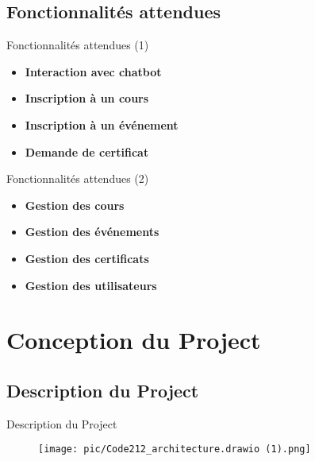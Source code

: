 \documentclass{beamer}
\begin{document}
\subsection{Fonctionnalités attendues}


\begin{frame}{Fonctionnalités attendues (1)}

    \begin{itemize}
        \setlength\itemsep{0.8em} %
        \item \textbf{Interaction avec chatbot}
        \item \textbf{Inscription à un cours}
        \item \textbf{Inscription à un événement}
        \item \textbf{Demande de certificat}

    \end{itemize}

\end{frame}


\begin{frame}{Fonctionnalités attendues (2)}

    \begin{itemize}
        \setlength\itemsep{0.8em} %

        \item \textbf{Gestion des cours}
        \item \textbf{Gestion des événements}
        \item \textbf{Gestion des certificats}
        \item \textbf{Gestion des utilisateurs}
    \end{itemize}

\end{frame}





\section{Conception du Project}
\subsection{Description du Project}
\begin{frame}{Description du Project}
    \begin{figure}[htpb]
        \centering
        \texttt{[image: pic/Code212\_architecture.drawio (1).png]}
    \end{figure}

\end{frame}
\end{document}
